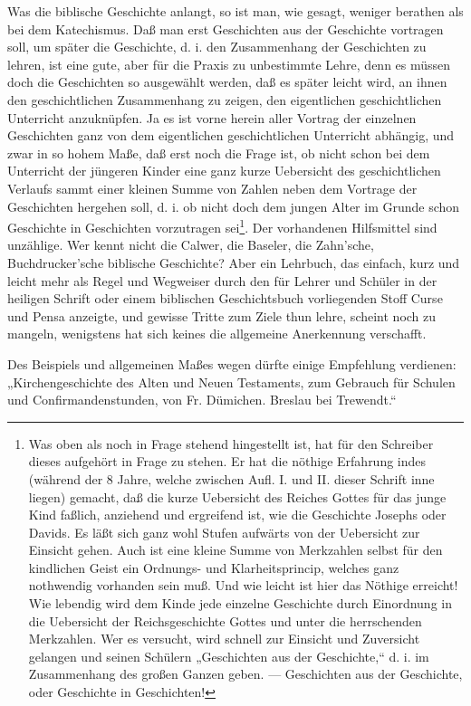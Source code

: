 Was die biblische Geschichte anlangt, so ist man, wie gesagt, weniger berathen als bei dem Katechismus. Daß man erst Geschichten aus der Geschichte vortragen soll, um später die Geschichte, d. i. den Zusammenhang der Geschichten zu lehren, ist eine gute, aber für die Praxis zu unbestimmte Lehre, denn es müssen doch die Geschichten so ausgewählt werden, daß es später leicht wird, an ihnen den geschichtlichen Zusammenhang zu zeigen, den eigentlichen geschichtlichen Unterricht anzuknüpfen. Ja es ist vorne herein aller Vortrag der einzelnen Geschichten ganz von dem eigentlichen geschichtlichen Unterricht abhängig, und zwar in so hohem Maße, daß erst noch die Frage ist, ob nicht schon bei dem Unterricht der jüngeren Kinder eine ganz kurze Uebersicht des geschichtlichen Verlaufs sammt einer kleinen Summe von Zahlen neben dem Vortrage der Geschichten hergehen soll, d. i. ob nicht doch dem jungen Alter im Grunde schon Geschichte in Geschichten vorzutragen sei\footnote{Was oben als noch in Frage stehend hingestellt ist, hat für den Schreiber dieses aufgehört in Frage zu stehen. Er hat die nöthige Erfahrung indes (während der 8 Jahre, welche zwischen Aufl. I. und II. dieser Schrift inne liegen) gemacht, daß die kurze Uebersicht des Reiches Gottes für das junge Kind faßlich, anziehend und ergreifend ist, wie die Geschichte Josephs oder Davids. Es läßt sich ganz wohl Stufen aufwärts von der Uebersicht zur Einsicht gehen. Auch ist eine kleine Summe von Merkzahlen selbst für den kindlichen Geist ein Ordnungs- und Klarheitsprincip, welches ganz nothwendig vorhanden sein muß. Und wie leicht ist hier das Nöthige erreicht! Wie lebendig wird dem Kinde jede einzelne Geschichte durch Einordnung in die Uebersicht der Reichsgeschichte Gottes und unter die herrschenden Merkzahlen. Wer es versucht, wird schnell zur Einsicht und Zuversicht gelangen und seinen Schülern „Geschichten aus der Geschichte,“ d. i. im Zusammenhang des großen Ganzen geben. — Geschichten aus der Geschichte, oder Geschichte in Geschichten!}. Der vorhandenen Hilfsmittel sind unzählige. Wer
kennt nicht die Calwer, die Baseler, die Zahn’sche, Buchdrucker’sche biblische Geschichte? Aber ein Lehrbuch, das einfach, kurz und leicht mehr als Regel und Wegweiser durch den für Lehrer und Schüler in der heiligen Schrift oder einem biblischen Geschichtsbuch vorliegenden Stoff Curse und Pensa anzeigte, und gewisse Tritte zum Ziele thun lehre, scheint noch zu mangeln, wenigstens hat sich keines die allgemeine Anerkennung verschafft.

Des Beispiels und allgemeinen Maßes wegen dürfte einige Empfehlung verdienen: „Kirchengeschichte des Alten und Neuen Testaments, zum Gebrauch für Schulen und Confirmandenstunden, von Fr. Dümichen. Breslau bei Trewendt.“


